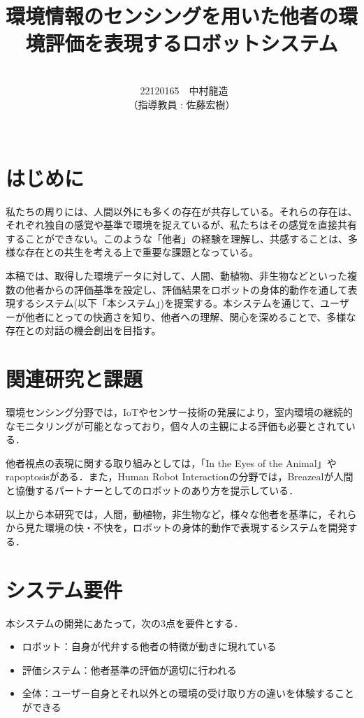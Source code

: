 \documentclass[paper=a4paper,jafontsize=9pt,head_space=15mm,gutter=20mm,
twocolumn,number_of_lines=49, line_length=26zw]{myuarticle}
\begin{document}
\title{{\LARGE\bfseries\gtfamily 環境情報のセンシングを用いた他者の環境評価を表現するロボットシステム}}
\author{\\\ 22120165　中村龍造 \\ （指導教員 : 佐藤宏樹）\\ \\}
\date{}
\maketitle

\section{はじめに}
私たちの周りには、人間以外にも多くの存在が共存している。それらの存在は、それぞれ独自の感覚や基準で環境を捉えているが、私たちはその感覚を直接共有することができない。このような「他者」の経験を理解し、共感することは、多様な存在との共生を考える上で重要な課題となっている。

本稿では、取得した環境データに対して、人間、動植物、非生物などといった複数の他者からの評価基準を設定し、評価結果をロボットの身体的動作を通して表現するシステム(以下「本システム」)を提案する。本システムを通じて、ユーザーが他者にとっての快適さを知り、他者への理解、関心を深めることで、多様な存在との対話の機会創出を目指す。

\section{関連研究と課題}

環境センシング分野では，IoTやセンサー技術の発展により，室内環境の継続的なモニタリングが可能となっており\cite{Saini-2020-IndoorAirQualityMonitoring}，個々人の主観による評価も必要とされている\cite{Coulby-2020-ScopingReviewTechnologicalApproaches}．

他者視点の表現に関する取り組みとしては，「In the Eyes of the
Animal」\cite{Dezeen-2015-MarshmallowLaserFeastsEyes}やrapoptosis\cite{--ソンヨン}がある．また，Human
Robot
Interactionの分野では，Breazeal\cite{C.Breazeal-2004-SocialInteractionsHRIRobot}が人間と協働するパートナーとしてのロボットのあり方を提示している．

以上から本研究では，人間，動植物，非生物など，様々な他者を基準に，それらから見た環境の快・不快を，ロボットの身体的動作で表現するシステムを開発する．

\section{システム要件}
本システムの開発にあたって，次の3点を要件とする．
\begin{itemize}
  \item ロボット：自身が代弁する他者の特徴が動きに現れている
  \item 評価システム：他者基準の評価が適切に行われる
  \item 全体：ユーザー自身とそれ以外との環境の受け取り方の違いを体験することができる
\end{itemize}
\end{document}
